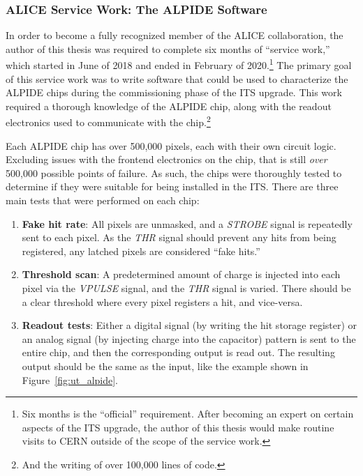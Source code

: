 \clearpage

\subsubsection{ALICE Service Work: The ALPIDE Software}
\label{sec:hardware_testing}

In order to become a fully recognized member of the ALICE collaboration, the author of this thesis was required to complete six months of ``service work,'' which started in June of 2018 and ended in February of 2020.\footnote{Six months is the ``official'' requirement. After becoming an expert on certain aspects of the ITS upgrade, the author of this thesis would make routine visits to CERN outside of the scope of the service work.} The primary goal of this service work was to write software that could be used to characterize the ALPIDE chips during the commissioning phase of the ITS upgrade. This work required a thorough knowledge of the ALPIDE chip, along with the readout electronics used to communicate with the chip.\footnote{And the writing of over 100,000 lines of code.}

Each ALPIDE chip has over 500,000 pixels, each with their own circuit logic. Excluding issues with the frontend electronics on the chip, that is still \textit{over} 500,000 possible points of failure. As such, the chips were thoroughly tested to determine if they were suitable for being installed in the ITS. There are three main tests that were performed on each chip:
\begin{enumerate}
    \item \textbf{Fake hit rate}: All pixels are unmasked, and a \textit{STROBE} signal is repeatedly sent to each pixel. As the \textit{THR} signal should prevent any hits from being registered, any latched pixels are considered ``fake hits.''
    \item \textbf{Threshold scan}: A predetermined amount of charge is injected into each pixel via the \textit{VPULSE} signal, and the \textit{THR} signal is varied. There should be a clear threshold where every pixel registers a hit, and vice-versa.
    \item \textbf{Readout tests}: Either a digital signal (by writing the hit storage register) or an analog signal (by injecting charge into the capacitor) pattern is sent to the entire chip, and then the corresponding output is read out. The resulting output should be the same as the input, like the example shown in Figure~\ref{fig:ut_alpide}.
\end{enumerate}


